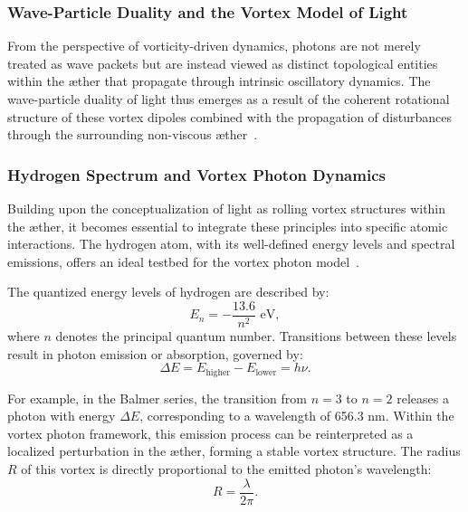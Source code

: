 \subsubsection*{Wave-Particle Duality and the Vortex Model of Light}\label{subsubsec:wave-particle-duality}
From the perspective of vorticity-driven dynamics, photons are not merely treated as wave packets but are instead viewed as distinct topological entities within the \ae ther that propagate through intrinsic oscillatory dynamics.
The wave-particle duality of light thus emerges as a result of the coherent rotational structure of these vortex dipoles combined with the propagation of disturbances through the surrounding non-viscous \ae ther~\cite{kleckner2016, orlandi2021}.

\subsubsection*{Hydrogen Spectrum and Vortex Photon Dynamics}
Building upon the conceptualization of light as rolling vortex structures within the \ae ther, it becomes essential to integrate these principles into specific atomic interactions.
The hydrogen atom, with its well-defined energy levels and spectral emissions, offers an ideal testbed for the vortex photon model~\cite{maxwell1861, clausius1865}.

The quantized energy levels of hydrogen are described by:
\begin{equation*}
    E_n = -\frac{13.6}{n^2} \text{ eV},\label{eq:quantized energy levels}
\end{equation*}
where $n$ denotes the principal quantum number.
Transitions between these levels result in photon emission or absorption, governed by:
\begin{equation*}
    \Delta E = E_{\text{higher}} - E_{\text{lower}} = h \nu.\label{eq:emission or absorption}
\end{equation*}

For example, in the Balmer series, the transition from $n=3$ to $n=2$ releases a photon with energy $\Delta E$, corresponding to a wavelength of 656.3 nm.
Within the vortex photon framework, this emission process can be reinterpreted as a localized perturbation in the \ae ther, forming a stable vortex structure.
The radius $R$ of this vortex is directly proportional to the emitted photon’s wavelength:
\begin{equation*}
    R = \frac{\lambda}{2\pi}.\label{eq:photon wavelength}
\end{equation*}

